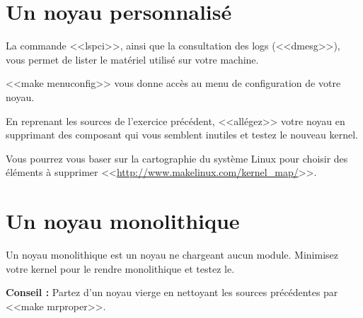 \documentclass[11pt]{article}
\begin{document}
\section{Un noyau personnalisé}

La commande <<lspci>>, ainsi que la consultation des logs (<<dmesg>>), vous permet de lister le matériel utilisé sur votre machine.

<<make menuconfig>> vous donne accès au menu de configuration de votre noyau.

En reprenant les sources de l'exercice précédent, <<allégez>> votre noyau en supprimant des composant qui vous semblent inutiles et testez le nouveau kernel.

Vous pourrez vous baser sur la cartographie du système Linux pour choisir des éléments à supprimer <<\url{http://www.makelinux.com/kernel_map/}>>.

\section{Un noyau monolithique}

Un noyau monolithique est un noyau ne chargeant aucun module. Minimisez votre kernel pour le rendre monolithique et testez le.

\textbf{Conseil :} Partez d'un noyau vierge en nettoyant les sources précédentes par <<make mrproper>>.
\end{document}
